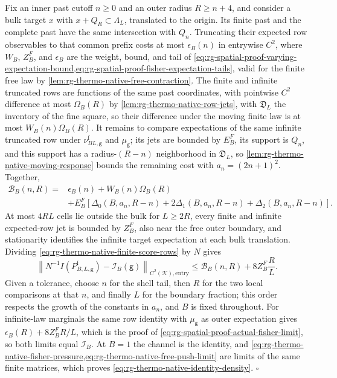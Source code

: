 Fix an inner past cutoff $n\ge0$ and an outer radius $R\ge n+4$, and consider
a bulk target $x$ with $x+Q_R\subset\Lambda_L$, translated to the origin. Its
finite past and the complete past have the same intersection with $Q_n$.
Truncating their expected row observables to that common prefix costs at most
$\epsilon_B(n)$ in entrywise $C^2$, where $W_B$, $Z^F_B$, and $\epsilon_B$
are the weight, bound, and tail of
\cref{eq:rg-spatial-proof-varying-expectation-bound,eq:rg-spatial-proof-fisher-expectation-tails},
valid for the finite free law by \cref{lem:rg-thermo-native-free-contraction}.
The finite and infinite truncated rows are functions of the same past
coordinates, with pointwise $C^2$ difference at most $\Omega_B(R)$ by
\cref{lem:rg-thermo-native-row-jets}, with $\mathfrak D_L$ the inventory of
the fine square, so their difference under the moving finite law is at most
$W_B(n)\Omega_B(R)$. It remains to compare
expectations of the same infinite truncated row under
$\nu^{\mathrm f}_{BL,\mathsf g}$ and $\mu_{\mathsf g}$; its jets are bounded by
$E_B^F$, its support is $Q_n$, and this support has a radius-$(R-n)$
neighborhood in $\mathfrak D_L$, so \cref{lem:rg-thermo-native-moving-response}
bounds the remaining cost with $a_n=(2n+1)^2$. Together,
\begin{equation}
 \begin{split}
 \mathcal B_B(n,R)={}&\epsilon_B(n)+W_B(n)\Omega_B(R)\\
 &+E_B^F[\Delta_0(B,a_n,R-n)+2\Delta_1(B,a_n,R-n)
                                  +\Delta_2(B,a_n,R-n)].
 \end{split}
 \label{eq:rg-thermo-native-three-cutoff-bulk}
\end{equation}
At most $4RL$ cells lie outside the bulk for $L\ge2R$, every finite and
infinite expected-row jet is bounded by $Z_B^F$, also near the free outer
boundary, and stationarity identifies the infinite target expectation at each
bulk translation. Dividing \cref{eq:rg-thermo-native-finite-score-rows} by $N$
gives
\begin{equation}
 \left\|N^{-1}I(P^{\mathrm f}_{B,L,\mathsf g})-\mathcal I_B(\mathsf g)
                                      \right\|_{C^2(\mathcal K),\mathrm{entry}}
 \le\mathcal B_B(n,R)+8Z_B^F\frac RL.
 \label{eq:rg-thermo-native-three-cutoff-bound}
\end{equation}
Given a tolerance, choose $n$ for the shell tail, then $R$ for the two local
comparisons at that $n$, and finally $L$ for the boundary fraction; this
order respects the growth of the constants in $a_n$, and $B$ is fixed
throughout. For infinite-law marginals the same row identity with
$\mu_{\mathsf g}$ as outer expectation gives
$\epsilon_B(R)+8Z_B^FR/L$, which is the proof of
\cref{eq:rg-spatial-proof-actual-fisher-limit}, so both limits equal
$\mathcal I_B$. At $B=1$ the channel is the identity, and
\cref{eq:rg-thermo-native-fisher-pressure,eq:rg-thermo-native-free-push-limit}
are limits of the same finite matrices, which proves
\cref{eq:rg-thermo-native-identity-density}. $\square$

